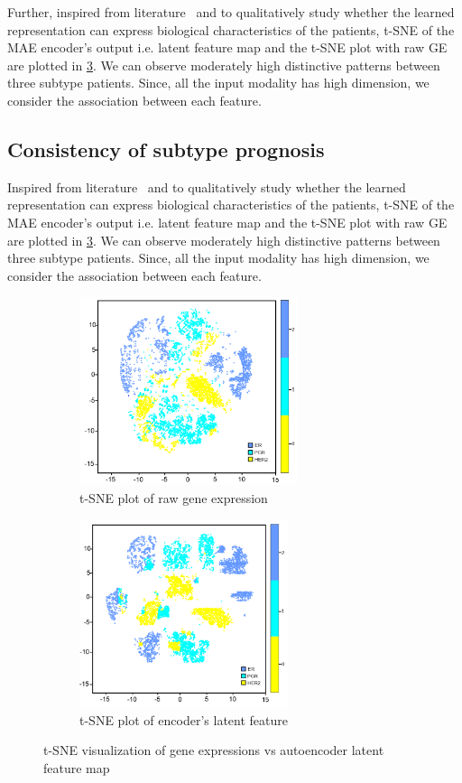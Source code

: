 \hspace*{3.5mm} Further, inspired from literature~\cite{rhee2017hybrid} and to qualitatively study whether the learned representation can express biological characteristics of the patients, t-SNE of the MAE encoder's output i.e. latent feature map and the t-SNE plot with raw GE are plotted in \cref{fig:tnse}. We can observe moderately high distinctive patterns between three subtype patients. Since, all the input modality has high dimension, we consider the association between each feature. 

\iffalse
\subsection{Consistency of subtype prognosis}
Inspired from literature~\cite{rhee2017hybrid} and to qualitatively study whether the learned representation can express biological characteristics of the patients, t-SNE of the MAE encoder's output i.e. latent feature map and the t-SNE plot with raw GE are plotted in \cref{fig:tnse}. We can observe moderately high distinctive patterns between three subtype patients. Since, all the input modality has high dimension, we consider the association between each feature. 

\begin{figure}[h]
	\centering
	\begin{subfigure}{.48\linewidth}
		\centering
		\includegraphics[width=0.9\linewidth,height=55mm]{images/raw_tsne.png}
		\caption{t-SNE plot of raw gene expression}
        \label{fig:tsne_raw}
	\end{subfigure}
	\begin{subfigure}{0.48\linewidth}
		\centering
		\includegraphics[width=0.9\linewidth,height=55mm]{images/ae_tsne.png}
		\caption{t-SNE plot of encoder's latent feature}
        \label{fig:tsne_ae}
	\end{subfigure}
	 \setlength{\belowcaptionskip}{-8pt}
	\caption{t-SNE visualization of gene expressions vs autoencoder latent feature map~\cite{karimACCESS2019}} 
	\label{fig:tnse}
\end{figure}

